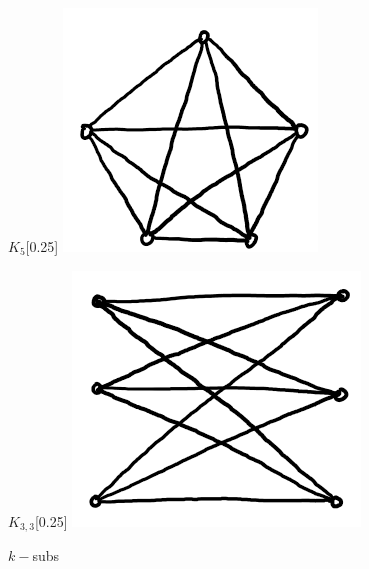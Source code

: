 \documentclass[12pt]{article}
\theoremstyle{definition}
\begin{document}
\begin{figure}[htb!]
  \centering
  \begin{subcaptionbox}{$K_5$\label{fig:fig1}}[0.25\textwidth]
    {\includegraphics[width=\linewidth]{graphs/K_5.png}}
  \end{subcaptionbox}
  \hspace{0.05\textwidth}
  \begin{subcaptionbox}{$K_{3,3}$\label{fig:fig2}}[0.25\textwidth]
    {\includegraphics[width=\linewidth]{graphs/K_3,3.png}}
  \end{subcaptionbox}
  \caption{$k-$subs}
  \label{fig:combined}
\end{figure}
\end{document}
